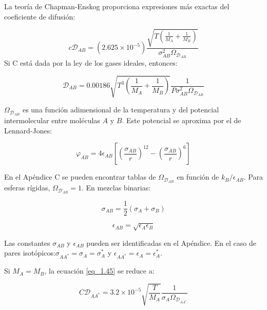 La teoría de Chapman-Enskog proporciona expresiones más exactas del coeficiente de difusión:

\begin{equation}
c \mathscr{D}_{AB} = (2.625 \times 10^{-5}) \frac{\sqrt{T(\frac{1}{M_A}+\frac{1}{M_B})}}{\sigma_{AB}^2 \Omega_{\mathscr{D}_{AB}}}\tag{1.45}\label{eq_1.45}
\end{equation}
Si C está dada por la ley de los gases ideales, entonces:

\begin{equation}
\mathscr{D}_{AB} = 0.00186 \sqrt{T^3(\frac{1}{M_A}+\frac{1}{M_B})}\frac{1}{P \sigma_{AB}^2 \Omega_{\mathscr{D}_{AB}}}  \tag{1.46}\label{eq_1.46}
\end{equation}

\(\Omega_{\mathscr{D}_{AB}}\) es una función adimensional de la temperatura y del potencial intermolecular entre moléculas \( A \) y \( B \). Este potencial se aproxima por el de Lennard-Jones:

\begin{equation}
\varphi_{AB}=4 \epsilon_{AB}[(\frac{\sigma_{AB}}{r})^{12}-(\frac{\sigma_{AB}}{r})^6]  \tag{1.47}\label{eq_1.47}
\end{equation}

En el Apéndice C se pueden encontrar tablas de \( \Omega_{\mathscr{D}_{AB}} \) en función de \( k_B / \epsilon_{AB} \). Para esferas rígidas, \( \Omega_{\mathscr{D}_{AB}} = 1 \). En mezclas binarias:

\begin{equation}
\sigma_{AB} = \frac{1}{2} (\sigma_A+\sigma_B)\tag{1.48}\label{eq_1.48}
\end{equation}

\begin{equation}
\epsilon_{AB} = \sqrt{\epsilon_A \epsilon_B}\tag{1.49}\label{eq_1.49}
\end{equation}

Las constantes $\sigma_{AB}$ y \( \epsilon_{AB} \) pueden ser identificadas en el Apéndice. En el caso de pares isotópicos:$\sigma_{AA^*}=\sigma_A=\sigma_A^*$  y  $\epsilon_{AA^*}=\epsilon_A=\epsilon_A^*$.




Si \( M_A = M_B \), la ecuación \ref{eq_1.45} se reduce a:

\begin{equation}
C\mathscr{D}_{AA^*} = 3.2 \times 10^{-5}\sqrt{\frac{T}{M_A}} \frac{1}{\sigma_A \Omega_{\mathscr{D}_{AA^*}}} \tag{1.50}\label{eq_1.50}
\end{equation}

